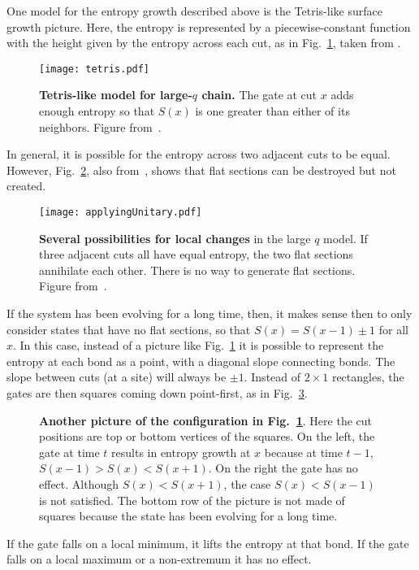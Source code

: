 One model for the entropy growth described above is the Tetris-like surface growth picture. Here, the entropy is represented by a piecewise-constant function with the height given by the entropy across each cut, as in Fig.~\ref{fig:tetris}, taken from \cite{Nahum2017}. 
\begin{figure}
	\centering
	\texttt{[image: tetris.pdf]}
	\caption{\textbf{Tetris-like model for large-$q$ chain.} The gate at cut $x$ adds enough entropy so that $S(x)$ is one greater than either of its neighbors. Figure from~\cite{Nahum2017}.}
	\label{fig:tetris}
\end{figure}
In general, it is possible for the entropy across two adjacent cuts to be equal. However, Fig.~\ref{fig:applyingUnitary}, also from~\cite{Nahum2017}, shows that flat sections can be destroyed but not created. 
\begin{figure}
	\centering
	\texttt{[image: applyingUnitary.pdf]}
	\caption{\textbf{Several possibilities for local changes} in the large $q$ model. If three adjacent cuts all have equal entropy, the two flat sections annihilate each other. There is no way to generate flat sections. Figure from~\cite{Nahum2017}.}
	\label{fig:applyingUnitary}
\end{figure}

If the system has been evolving for a long time, then, it makes sense then to only consider states that have no flat sections, so that $S(x) = S(x-1)\pm1$ for all $x$. In this case, instead of a picture like Fig.~\ref{fig:tetris} it is possible to represent the entropy at each bond as a point, with a diagonal slope connecting bonds. The slope between cuts (at a site) will always be $\pm1$. Instead of $2\times1$ rectangles, the gates are then squares coming down point-first, as in Fig.~\ref{fig:diaggate}. 
\begin{figure}
	\centering
	
	\caption{\textbf{Another picture of the configuration in Fig.~\ref{fig:tetris}}. Here the cut positions are top or bottom vertices of the squares. On the left, the gate at time $t$ results in entropy growth at $x$ because at time $t-1$, $S(x-1) > S(x) < S(x+1)$. On the right the gate has no effect. Although $S(x) < S(x+1)$, the case $S(x) < S(x-1)$ is not satisfied. The bottom row of the picture is not made of squares because the state has been evolving for a long time.}
	\label{fig:diaggate}
\end{figure}
If the gate falls on a local minimum, it lifts the entropy at that bond. If the gate falls on a local maximum or a non-extremum it has no effect.

